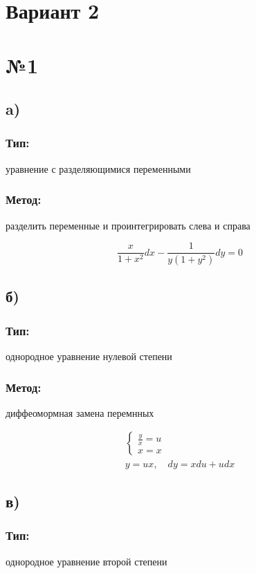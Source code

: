 \documentclass{article}
\begin{document}
\section*{Вариант 2}
\section*{№1}
\subsection*{a)}
\subsubsection*{Тип:} 
уравнение с разделяющимися переменными
\subsubsection*{Метод:}
разделить переменные и проинтегрировать слева и справа

\begin{equation*}
\frac{x}{1 + x^2}dx - \frac{1}{y(1+y^2)}dy = 0
\end{equation*}

\subsection*{б)}
\subsubsection*{Тип:} 
однородное уравнение нулевой степени
\subsubsection*{Метод:}
диффеомормная замена перемнных

\begin{gather*}
\begin{cases}
\frac{y}{x}=u \\
x=x
\end{cases}\\
y=ux, \quad   dy=xdu+udx 
\end{gather*}

\subsection*{в)}
\subsubsection*{Тип:} 
однородное уравнение второй степени
\end{document}
